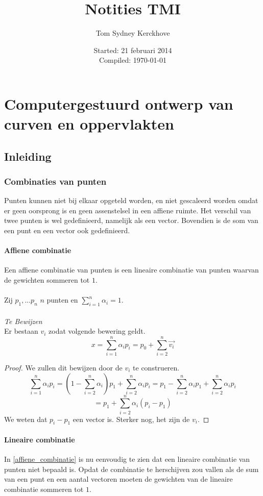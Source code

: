 \documentclass[10pt,a4paper,oneside]{book}
\author{Tom Sydney Kerckhove}
\title{Notities TMI}
\date{Started: 21 februari 2014\\ Compiled: \today}
\begin{document}
\maketitle
\tableofcontents

\part{Computergestuurd ontwerp van curven en oppervlakten}
\chapter{Inleiding}
\section{Combinaties van punten}
Punten kunnen niet bij elkaar opgeteld worden, en niet gescaleerd worden omdat er geen oorsprong is en geen assenstelsel in een affiene ruimte.
Het verschil van twee punten is wel gedefinieerd, namelijk als een vector. Bovendien is de som van een punt en een vector ook gedefinieerd.
\subsection{Affiene combinatie}
Een affiene combinatie van punten is een lineaire combinatie van punten waarvan de gewichten sommeren tot $1$.\\\\
Zij $p_1,...p_n$ $n$ punten en $\sum_{i=1}^n\alpha_i=1$.\\\\
\textit{Te Bewijzen}\\
\label{affiene_combinatie}
Er bestaan $v_i$ zodat volgende bewering geldt.
\[
x = \sum_{i=1}^n\alpha_ip_i = p_0 + \sum_{i=2}^n\vec{v_i}
\]

\begin{proof}
We zullen dit bewijzen door de $v_i$ te construeren.
\[
\sum_{i=1}^n\alpha_ip_i
= \left(1-\sum_{i=2}^n\alpha_i\right)p_1 + \sum_{i=2}^n\alpha_ip_i
= p_1 - \sum_{i=2}^n\alpha_ip_1 + \sum_{i=2}^n\alpha_ip_i
\]
\[
=
p_1 + \sum_{i=2}^n\alpha_i(p_i-p_1)
\]
We weten dat $p_i-p_1$ een vector is. Sterker nog, het zijn de $v_i$.
\end{proof}
 
\subsection{Lineaire combinatie}
In \ref{affiene_combinatie} is nu eenvoudig te zien dat een lineaire combinatie van punten niet bepaald is.
Opdat de combinatie te herschijven zou vallen als de sum van een punt en een aantal vectoren moeten de gewichten van de lineaire combinatie sommeren tot $1$. 
\end{document}
